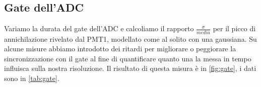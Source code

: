 \subsection{Gate dell'ADC}

Variamo la durata del gate dell'ADC e calcoliamo il rapporto $\frac{\sigma}{media}$ per il picco di annichilazione rivelato dal PMT1, modellato come al solito con una gaussiana.
Su alcune misure abbiamo introdotto dei ritardi per migliorare o peggiorare la sincronizzazione con il gate al fine di quantificare quanto una la messa in tempo influisca sulla nostra risoluzione. Il risultato di questa misura è in \autoref{fig:gate}, i dati sono in \autoref{tab:gate}.

